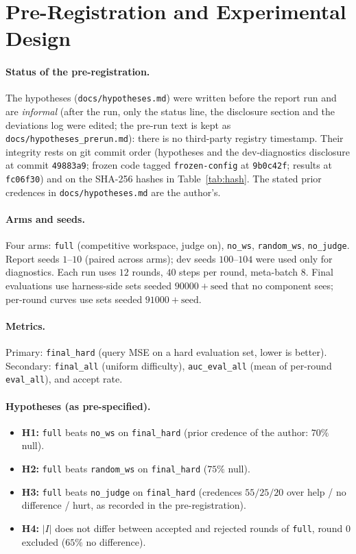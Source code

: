 \documentclass[11pt]{article}
\newcommand{\commitHyp}{\texttt{49883a9}}
\newcommand{\commitFrozen}{\texttt{9b0c42f}}
\newcommand{\commitResults}{\texttt{fc06f30}}
\newcommand{\fh}{\texttt{final\_hard}}
\newcommand{\fa}{\texttt{final\_all}}
\newcommand{\auc}{\texttt{auc\_eval\_all}}
\begin{document}
\section{Pre-Registration and Experimental Design}

\paragraph{Status of the pre-registration.} The hypotheses (\texttt{docs/hypotheses.md}) were written before the report run and are \emph{informal} (after the run, only the status line, the disclosure section and the deviations log were edited; the pre-run text is kept as \texttt{docs/hypotheses\_prerun.md}): there is no third-party registry timestamp. Their integrity rests on git commit order
(hypotheses and the dev-diagnostics disclosure at commit \commitHyp; frozen code tagged \texttt{frozen-config} at \commitFrozen; results at \commitResults) and on the SHA-256 hashes in Table~\ref{tab:hash}.
The stated prior credences in \texttt{docs/hypotheses.md} are the author's.

\paragraph{Arms and seeds.} Four arms: \texttt{full} (competitive workspace, judge on), \texttt{no\_ws}, \texttt{random\_ws}, \texttt{no\_judge}. Report seeds $1$--$10$ (paired across arms);
dev seeds $100$--$104$ were used only for diagnostics. Each run uses $12$ rounds, $40$ steps per round, meta-batch $8$.
Final evaluations use harness-side sets seeded $90000+\text{seed}$ that no component sees; per-round curves use sets seeded $91000+\text{seed}$.

\paragraph{Metrics.} Primary: \fh{} (query MSE on a hard evaluation set, lower is better). Secondary: \fa{} (uniform difficulty),
\auc{} (mean of per-round \texttt{eval\_all}), and accept rate.

\paragraph{Hypotheses (as pre-specified).}
\begin{itemize}\setlength\itemsep{0pt}
\item \textbf{H1:} \texttt{full} beats \texttt{no\_ws} on \fh{} (prior credence of the author: $70\%$ null).
\item \textbf{H2:} \texttt{full} beats \texttt{random\_ws} on \fh{} ($75\%$ null).
\item \textbf{H3:} \texttt{full} beats \texttt{no\_judge} on \fh{} (credences $55/25/20$ over help / no difference / hurt, as recorded in the pre-registration).
\item \textbf{H4:} $|I|$ does not differ between accepted and rejected rounds of \texttt{full}, round $0$ excluded ($65\%$ no difference).
\end{itemize}
\end{document}
